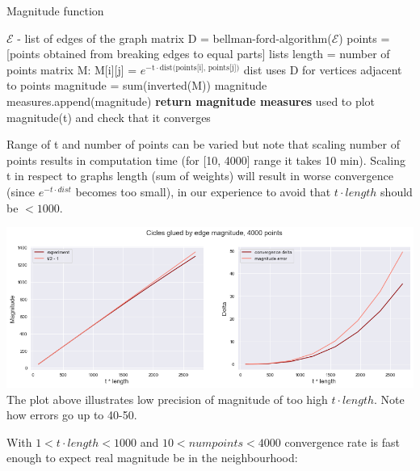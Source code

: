 \documentclass{article}
\begin{document}
\begin{algorithm}
\caption{Magnitude function}\label{euclid}
\begin{algorithmic}[1]
    \Require $\mathcal{E}$ - list of edges of the graph 
    \State matrix D = bellman-ford-algorithm($\mathcal{E}$)  
      \State points = [points obtained from breaking edges to equal parts] \Comment lists length = number of points 
      \State matrix M: M[i][j] = $e^{-\text{t} \cdot \text{dist(points[i], points[j])}}$ \Comment dist uses D for vertices adjacent to points
      \State magnitude = sum(inverted(M))
      \State magnitude measures.append(magnitude)
    \EndFor
  \EndFor
    \State \textbf{return magnitude measures} \Comment used to plot magnitude(t) and check that it converges
\EndProcedure
\end{algorithmic}
\end{algorithm}

Range of t and number of points can be varied but note that scaling number of points
results in computation time (for [10, 4000] range it takes 10 min). Scaling t in
respect to graphs length (sum of weights) will result in worse convergence (since 
$e^{-t \cdot dist}$ becomes too small), in our experience to avoid that $t \cdot length$
should be $< 1000$. 

\begin{center}
\includegraphics[width=1\textwidth]{too_high_t} \\ The plot above illustrates
    low precision of magnitude of too high $t \cdot length$.
    Note how errors go up to 40-50.
\end{center}

With $1 < t \cdot length < 1000$ and $10 < num points < 4000$ convergence rate is 
fast enough to expect real magnitude be in the neighbourhood:
\end{document}
